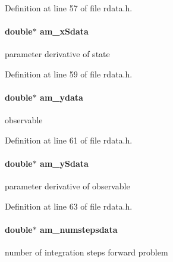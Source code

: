 Definition at line 57 of file rdata.\+h.

\hypertarget{struct_return_data_a097369567440c923ac24256e75ab3e89}{}
\paragraph[{am\+\_\+x\+Sdata}]{\setlength{\rightskip}{0pt plus 5cm}double$\ast$ am\+\_\+x\+Sdata}\label{struct_return_data_a097369567440c923ac24256e75ab3e89}
parameter derivative of state 

Definition at line 59 of file rdata.\+h.

\hypertarget{struct_return_data_a24568582aa8de699ea1ce53323ff26ca}{}
\paragraph[{am\+\_\+ydata}]{\setlength{\rightskip}{0pt plus 5cm}double$\ast$ am\+\_\+ydata}\label{struct_return_data_a24568582aa8de699ea1ce53323ff26ca}
observable 

Definition at line 61 of file rdata.\+h.

\hypertarget{struct_return_data_aa2089cdd16d3cb3c9b85f99f570197d1}{}
\paragraph[{am\+\_\+y\+Sdata}]{\setlength{\rightskip}{0pt plus 5cm}double$\ast$ am\+\_\+y\+Sdata}\label{struct_return_data_aa2089cdd16d3cb3c9b85f99f570197d1}
parameter derivative of observable 

Definition at line 63 of file rdata.\+h.

\hypertarget{struct_return_data_a2ebada170b4bc6a2337794e4ec08d77c}{}
\paragraph[{am\+\_\+numstepsdata}]{\setlength{\rightskip}{0pt plus 5cm}double$\ast$ am\+\_\+numstepsdata}\label{struct_return_data_a2ebada170b4bc6a2337794e4ec08d77c}
number of integration steps forward problem 

